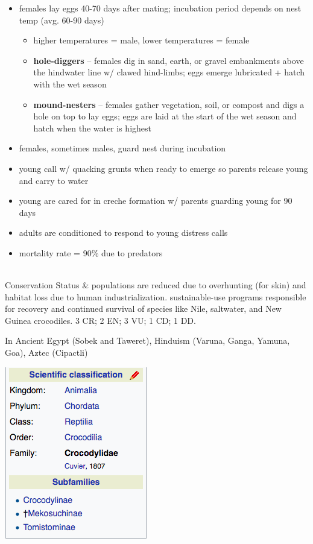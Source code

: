 \begin{center}
\begin{longtabu}
\begin{itemize}[noitemsep]
		\item females lay eggs 40-70 days after mating; incubation period depends on nest temp (avg. 60-90 days)
			\begin{itemize}[noitemsep]
			\item higher temperatures = male, lower temperatures = female
			\item \textbf{hole-diggers} -- females dig in sand, earth, or gravel embankments above the hindwater line w/ clawed hind-limbs; eggs emerge lubricated + hatch with the wet season
			\item \textbf{mound-nesters} -- females gather vegetation, soil, or compost  and digs a hole on top to lay eggs; eggs are laid at the start of the wet season and hatch when the water is highest
			\end{itemize}
		\item females, sometimes males, guard nest during incubation
		\item young call w/ quacking grunts when ready to emerge so parents release young and carry to water
		\item young are cared for in creche formation w/ parents guarding young for 90 days
		\item adults are conditioned to respond to young distress calls
		\item mortality rate = 90\% due to predators
	\end{itemize}
	\\
	\hline
	Conservation Status &
	populations are reduced due to overhunting (for skin) and habitat loss due to human industrialization. sustainable-use programs responsible for recovery and continued survival of species like Nile, saltwater, and New Guinea crocodiles. 3 CR; 2 EN; 3 VU; 1 CD; 1 DD. 
	
	In Ancient Egypt (Sobek and Taweret), Hinduism (Varuna, Ganga, Yamuna, Goa), Aztec (Cipactli)
	 \\
	\hline 
\end{longtabu}
\includegraphics[scale=0.75]{crocodylia/crocodylidae/crocodylidae.png}
\end{center}